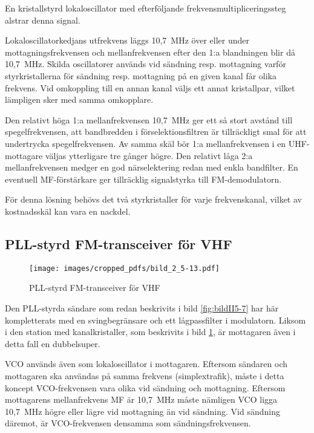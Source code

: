 

En kristallstyrd lokaloscillator med efterföljande
frekvensmultipliceringssteg alstrar denna signal.

Lokaloscillatorkedjans utfrekvens läggs 10,7~MHz över eller under
mottagningsfrekvensen och mellanfrekvensen efter den 1:a blandningen
blir då 10,7~MHz.
Skilda oscillatorer används vid sändning resp. mottagning varför
styrkristallerna för sändning resp. mottagning på en given kanal får
olika frekvens.
Vid omkoppling till en annan kanal väljs ett annat kristallpar, vilket
lämpligen sker med samma omkopplare.

Den relativt höga 1:a mellanfrekvensen 10,7~MHz ger ett så stort
avstånd till spegelfrekvensen, att bandbredden i förselektionsfiltren
är tillräckligt smal för att undertrycka spegelfrekvensen.
Av samma skäl bör 1:a mellanfrekvensen i en UHF-mottagare väljas ytterligare
tre gånger högre.
Den relativt låga 2:a mellanfrekvensen medger en god närselektering
redan med enkla bandfilter.
En eventuell MF-förstärkare ger tillräcklig signalstyrka till FM-demodulatorn.

För denna lösning behövs det två styrkristaller för varje
frekvenskanal, vilket av kostnadsskäl kan vara en nackdel.

\subsection{PLL-styrd FM-transceiver för VHF}

\begin{figure}
  \texttt{[image: images/cropped\_pdfs/bild\_2\_5-13.pdf]}
  \caption{PLL-styrd FM-transceiver för VHF}
  \label{fig:bildII5-13}
\end{figure}

Den PLL-styrda sändare som redan beskrivits i bild \ref{fig:bildII5-7} har här
kompletterats med en svingbegränsare och ett lågpassfilter i modulatorn.
Liksom i den station med kanalkristaller, som beskrivits i
bild \ref{fig:bildII5-13}, är mottagaren även i detta fall en dubbelsuper.

VCO används även som lokaloscillator i mottagaren.
Eftersom sändaren och mottagaren ska användas på samma frekvens
(simplextrafik), måste i detta koncept VCO-frekvensen vara olika vid
sändning och mottagning.
Eftersom mottagarens mellanfrekvens MF är 10,7~MHz måste nämligen VCO
ligga 10,7~MHz högre eller lägre vid mottagning än vid sändning.
Vid sändning däremot, är VCO-frekvensen densamma som sändningsfrekvensen.

